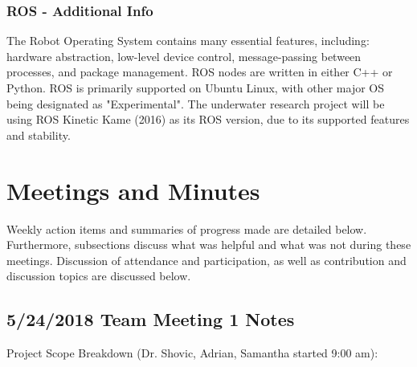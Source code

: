 \documentclass[12pt]{article}
\begin{document}
		\subsubsection{ROS - Additional Info}
		The Robot Operating System contains many essential features, including: hardware abstraction, low-level device control, message-passing between processes, and package management. ROS nodes are written in either C++ or Python. ROS is primarily supported on Ubuntu Linux, with other major OS being designated as "Experimental". The underwater research project will be using ROS Kinetic Kame (2016) as its ROS version, due to its supported features and stability. 
		
		\newpage
	
	\section{Meetings and Minutes}
	Weekly action items and summaries of progress made are detailed below. Furthermore, subsections discuss what was helpful and what was not during these meetings. Discussion of attendance and participation, as well as contribution and discussion topics are discussed below.
	
		\subsection{5/24/2018 Team Meeting 1 Notes}
		
			\noindent
			Project Scope Breakdown (Dr. Shovic, Adrian, Samantha started 9:00 am):
			
\end{document}
